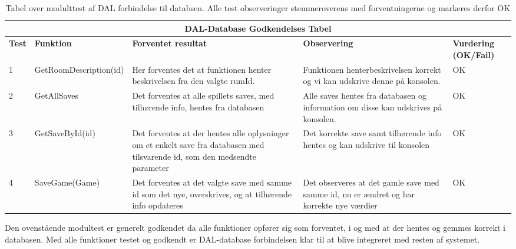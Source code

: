 \begin{table}[H]
\caption{Tabel over modulttest af DAL forbindelse til databsen. Alle test observeringer stemmeroverens med forventningerne og markeres derfor OK }
\label{table:Modulttest-DB-Tabel}
\begin{tabular}{|p{0.75cm}|p{3.6cm}|p{3.5cm}|p{3.5cm}|p{1.9cm}|} \hline
\multicolumn{5}{|c|}{\textbf{DAL-Database Godkendelses Tabel}} \\ \hline
 \textbf{Test} & \textbf{Funktion} & \textbf{Forventet resultat} & \textbf{Observering} & \textbf{Vurdering} \textbf{(OK/Fail)}\\\hline
 1 & GetRoomDescription(id) & Her forventes det at funktionen henter beskrivelsen fra den valgte rumId. & Funktionen henterbeskrivelsen korrekt og vi kan udskrive denne på konsolen. & OK \\ \hline
 2 & GetAllSaves & Det forventes at alle spillets saves, med tilhørende info, hentes fra databasen & Alle saves hentes fra databasen og information om disse kan udskrives på konsolen. & OK \\ \hline
 3 & GetSaveById(id) & Det forventes at der hentes alle oplysninger om et enkelt save fra databasen med tilsvarende id, som den medsendte parameter & Det korrekte save samt tilhørende info hentes og kan udskrive til konsolen & OK \\ \hline
 4 & SaveGame(Game) & Det forventes at det valgte save med samme id som det nye, overskrives, og at tilhørende info opdateres & Det observeres at det gamle save med samme id, nu er ændret og har korrekte nye værdier & OK \\ \hline
\end{tabular}
\end{table}

Den ovenstående modultest er generelt godkendet da alle funktioner opfører sig som forventet, i og med at der hentes og gemmes korrekt i databasen. Med alle funktioner testet og godkendt er DAL-database forbindelsen klar til at blive integreret med resten af systemet.
